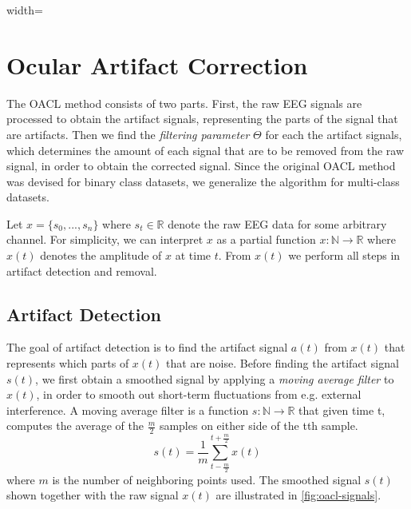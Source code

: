 \begin{figure*}%
\centering
\begin{adjustbox}{width=\textwidth}
	\newlength\figureheight
	\newlength\figurewidth
	\setlength\figureheight{6cm}
	\setlength\figurewidth{\textwidth}
	
\end{adjustbox}
\vspace{-2em}
\label{fig:oacl-signals}
\caption{Smoothed and artifact signal superimposed on the raw EEG signal for a single channel.}
\end{figure*}
\section{Ocular Artifact Correction}
The OACL method consists of two parts. First, the raw EEG signals are processed to obtain the artifact signals, representing the parts of the signal that are artifacts. Then we find the \emph{filtering parameter} $\Theta$ for each the artifact signals, which determines the amount of each signal that are to be removed from the raw signal, in order to obtain the corrected signal. 
Since the original OACL method \citep{li2015ocular} was devised for binary class datasets, we generalize the algorithm for multi-class datasets. 

Let $x = \{s_0, ...,s_n\}$ where $s_t \in \mathbb{R}$ denote the raw EEG data for some arbitrary channel. For simplicity, we can interpret $x$ as a partial function $x : \mathbb{N} \rightarrow \mathbb{R}$ where $x(t)$ denotes the amplitude of $x$ at time $t$. 
From $x(t)$ we perform all steps in artifact detection and removal.


\subsection{Artifact Detection}
The goal of artifact detection is to find the artifact signal $a(t)$ from $x(t)$ that represents which parts of $x(t)$ that are noise. Before finding the artifact signal $s(t)$, we first obtain a smoothed signal by applying a \emph{moving average filter} to $x(t)$, in order to smooth out short-term fluctuations from e.g. external interference. A moving average filter is a function $s: \mathbb{N} \rightarrow \mathbb{R}$ that given time t, computes the average of the $\frac{m}{2}$ samples on either side of the tth sample. 
\begin{equation}
\label{eq:movavg}
s(t) = \frac{1}{m}\sum_{t-\frac{m}{2}}^{t+\frac{m}{2}}x(t)
\end{equation}
where $m$ is the number of neighboring points used. The smoothed signal $s(t)$ shown together with the raw signal $x(t)$ are illustrated in \cref{fig:oacl-signals}.

